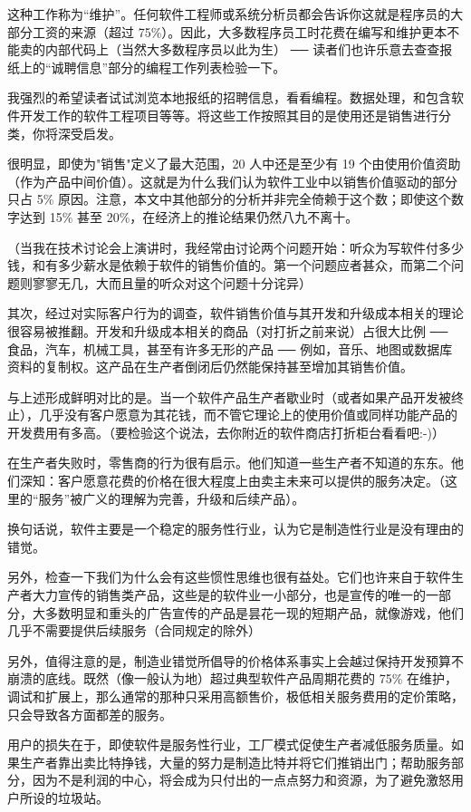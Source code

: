 这种工作称为“维护”。任何软件工程师或系统分析员都会告诉你这就是程序员的大部分工资的来源（超过 75\%）。因此，大多数程序员工时花费在编写和维护更本不能卖的内部代码上（当然大多数程序员以此为生） ── 读者们也许乐意去查查报纸上的“诚聘信息”部分的编程工作列表检验一下。


我强烈的希望读者试试浏览本地报纸的招聘信息，看看编程。数据处理，和包含软件开发工作的软件工程项目等等。将这些工作按照其目的是使用还是销售进行分类，你将深受启发。


很明显，即使为"销售"定义了最大范围，20 人中还是至少有 19 个由使用价值资助（作为产品中间价值）。这就是为什么我们认为软件工业中以销售价值驱动的部分只占 5\% 原因。注意，本文中其他部分的分析并非完全倚赖于这个数；即使这个数字达到 15\% 甚至 20\%，在经济上的推论结果仍然八九不离十。


（当我在技术讨论会上演讲时，我经常由讨论两个问题开始：听众为写软件付多少钱，和有多少薪水是依赖于软件的销售价值的。第一个问题应者甚众，而第二个问题则寥寥无几，大而且量的听众对这个问题十分诧异）


其次，经过对实际客户行为的调查，软件销售价值与其开发和升级成本相关的理论很容易被推翻。开发和升级成本相关的商品（对打折之前来说）占很大比例 ── 食品，汽车，机械工具，甚至有许多无形的产品 ── 例如，音乐、地图或数据库资料的复制权。这产品在生产者倒闭后仍然能保持甚至增加其销售价值。


与上述形成鲜明对比的是。当一个软件产品生产者歇业时（或者如果产品开发被终止），几乎没有客户愿意为其花钱，而不管它理论上的使用价值或同样功能产品的开发费用有多高。（要检验这个说法，去你附近的软件商店打折柜台看看吧:-)）


在生产者失败时，零售商的行为很有启示。他们知道一些生产者不知道的东东。他们深知：客户愿意花费的价格在很大程度上由卖主未来可以提供的服务决定。（这里的“服务”被广义的理解为完善，升级和后续产品）。


换句话说，软件主要是一个稳定的服务性行业，认为它是制造性行业是没有理由的错觉。


另外，检查一下我们为什么会有这些惯性思维也很有益处。它们也许来自于软件生产者大力宣传的销售类产品，这些是的软件业一小部分，也是宣传的唯一的一部分，大多数明显和重头的广告宣传的产品是昙花一现的短期产品，就像游戏，他们几乎不需要提供后续服务（合同规定的除外）


另外，值得注意的是，制造业错觉所倡导的价格体系事实上会越过保持开发预算不崩溃的底线。既然（像一般认为地）超过典型软件产品周期花费的 75\% 在维护，调试和扩展上，那么通常的那种只采用高额售价，极低相关服务费用的定价策略，只会导致各方面都差的服务。


用户的损失在于，即使软件是服务性行业，工厂模式促使生产者减低服务质量。如果生产者靠出卖比特挣钱，大量的努力是制造比特并将它们推销出门；帮助服务部分，因为不是利润的中心，将会成为只付出的一点点努力和资源，为了避免激怒用户所设的垃圾站。


